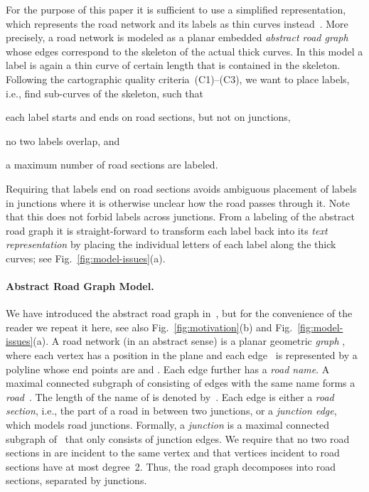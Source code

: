 \documentclass[a4paper,11pt]{article}
\begin{document}
For the purpose of this paper it is sufficient to use a simplified representation, which represents the road network
and its labels as thin curves instead~\cite{rlTheory}. More precisely, a road
network is modeled as a planar embedded \emph{abstract road graph} whose edges
correspond to the skeleton of the actual thick curves.  In this model a
label is again a thin curve of certain length that is contained in the
skeleton. Following the cartographic quality criteria~(C1)--(C3),
we want to place labels, i.e., find sub-curves of the skeleton,
such that
\begin{inparaenum}[(1)]
\item each label starts and ends on road sections, but not on junctions,
\item no two labels overlap, and
\item a maximum number of road sections are labeled. \end{inparaenum}
Requiring that labels end on road sections avoids ambiguous placement
of labels in junctions where it is otherwise unclear how the road passes through
it. Note that this does not forbid labels across junctions. From a
labeling of the abstract road graph it is straight-forward to
transform each label back into its \emph{text representation} by
placing the individual letters of each label along the thick curves; see
Fig.~\ref{fig:model-issues}(a).


\paragraph{Abstract Road Graph Model.}
We have introduced the abstract road graph in~\cite{rlTheory}, but for
the convenience of the reader we repeat it here, see also
Fig.~\ref{fig:motivation}(b) and Fig.~\ref{fig:model-issues}(a).   A road
network (in an abstract sense) is a planar geometric \emph{graph}
, where each vertex  has a position in the plane and
each edge~ is represented by a polyline whose end points
are  and .  Each edge further has a \emph{road name}. A
maximal connected subgraph of  consisting of edges with the same name
forms a \emph{road}~. The length of the name of  is denoted by~.
Each edge  is either a \emph{road section}, i.e., the part of a road in between two junctions, or a \emph{junction edge}, which
models road junctions. Formally, a \emph{junction} is a maximal connected
subgraph of~ that only consists of junction edges. We require that no two road sections in  are incident to the same vertex and that vertices incident to road sections have at
most degree~2. Thus, the road graph  decomposes into road sections, separated by junctions.
\end{document}

